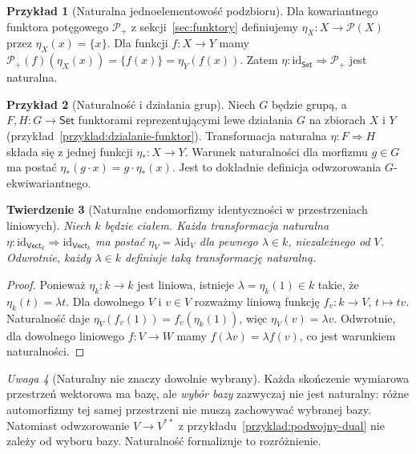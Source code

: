 \documentclass[11pt,a4paper]{article}
\numberwithin{equation}{section}
\theoremstyle{plain}
\newtheorem{twierdzenie}{Twierdzenie}[section]
\theoremstyle{definition}
\newtheorem{przyklad}[twierdzenie]{Przykład}
\theoremstyle{remark}
\newtheorem{uwaga}[twierdzenie]{Uwaga}
\newcommand{\cat}[1]{\mathsf{#1}}
\newcommand{\Set}{\cat{Set}}
\newcommand{\Vect}{\cat{Vect}}
\newcommand{\id}{\mathrm{id}}
\begin{document}
\begin{przyklad}[Naturalna jednoelementowość podzbioru]
Dla kowariantnego funktora potęgowego $\mathcal P_+$ z sekcji~\ref{sec:funktory} definiujemy $\eta_X:X\to\mathcal P(X)$ przez $\eta_X(x)=\{x\}$. Dla funkcji $f:X\to Y$ mamy $\mathcal P_+(f)(\eta_X(x))=\{f(x)\}=\eta_Y(f(x))$. Zatem $\eta:\id_{\Set}\Rightarrow\mathcal P_+$ jest naturalna.
\end{przyklad}

\begin{przyklad}[Naturalność i działania grup]
Niech $G$ będzie grupą, a $F,H:G\to\Set$ funktorami reprezentującymi lewe działania $G$ na zbiorach $X$ i $Y$ (przykład~\ref{przyklad:dzialanie-funktor}). Transformacja naturalna $\eta:F\Rightarrow H$ składa się z jednej funkcji $\eta_*:X\to Y$. Warunek naturalności dla morfizmu $g\in G$ ma postać $\eta_*(g\cdot x)=g\cdot\eta_*(x)$. Jest to dokładnie definicja odwzorowania $G$-ekwiwariantnego.
\end{przyklad}

\begin{twierdzenie}[Naturalne endomorfizmy identyczności w przestrzeniach liniowych]\label{tw:skalarnosc}
Niech $k$ będzie ciałem. Każda transformacja naturalna $\eta:\id_{\Vect_k}\Rightarrow\id_{\Vect_k}$ ma postać $\eta_V=\lambda\id_V$ dla pewnego $\lambda\in k$, niezależnego od $V$. Odwrotnie, każdy $\lambda\in k$ definiuje taką transformację naturalną.
\end{twierdzenie}
\begin{proof}
Ponieważ $\eta_k:k\to k$ jest liniowa, istnieje $\lambda=\eta_k(1)\in k$ takie, że $\eta_k(t)=\lambda t$. Dla dowolnego $V$ i $v\in V$ rozważmy liniową funkcję $f_v:k\to V$, $t\mapsto tv$. Naturalność daje $\eta_V(f_v(1))=f_v(\eta_k(1))$, więc $\eta_V(v)=\lambda v$. Odwrotnie, dla dowolnego liniowego $f:V\to W$ mamy $f(\lambda v)=\lambda f(v)$, co jest warunkiem naturalności.
\end{proof}

\begin{uwaga}[Naturalny nie znaczy dowolnie wybrany]
Każda skończenie wymiarowa przestrzeń wektorowa ma bazę, ale \emph{wybór bazy} zazwyczaj nie jest naturalny: różne automorfizmy tej samej przestrzeni nie muszą zachowywać wybranej bazy. Natomiast odwzorowanie $V\to V^{**}$ z przykładu~\ref{przyklad:podwojny-dual} nie zależy od wyboru bazy. Naturalność formalizuje to rozróżnienie.
\end{uwaga}
\end{document}
